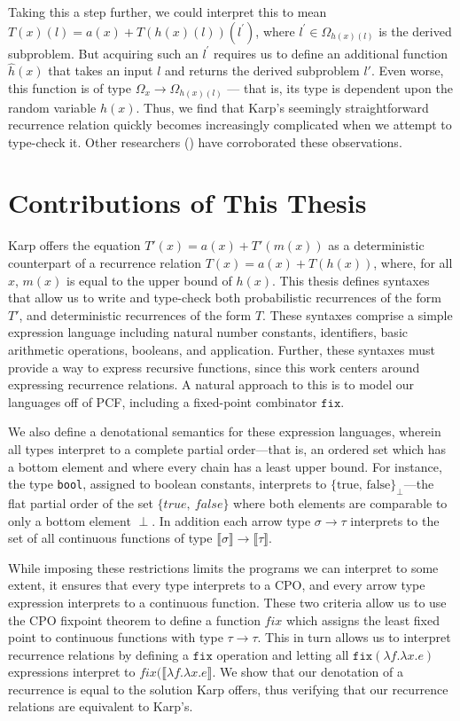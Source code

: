 Taking this a step further, we could interpret this to mean $T(x)(l) = a(x) + T(h(x)(l))(l^\prime)$, where $l^\prime \in 
\Omega_{h(x)(l)}$ is the derived subproblem. But acquiring such an $l^\prime$ requires us to define an 
additional function $\hat{h}(x)$ that takes an input $l$ and returns the derived subproblem $l'$. 
Even worse, this function is of type $\Omega_x \rightarrow \Omega_{h(x)(l)}$ --- that is, its type is dependent 
upon the random variable $h(x)$. Thus, we find that Karp's seemingly straightforward recurrence relation quickly becomes 
increasingly complicated when we attempt to type-check it. Other researchers (\cite{Tassarotti:2017aa}) have corroborated 
these observations. 


\section{Contributions of This Thesis}

Karp offers the equation $T'(x) = a(x) + T'(m(x))$ as a deterministic counterpart of a recurrence relation $T(x) = a(x) + 
T(h(x))$, where, for all $x$, $m(x)$ is equal to the upper bound of $h(x)$. This thesis defines syntaxes that allow
us to write and type-check both probabilistic recurrences of the form $T'$, and deterministic recurrences
of the form $T$. These syntaxes comprise a simple expression language including natural number constants, identifiers, basic arithmetic operations, booleans, and application. Further, these syntaxes must provide
a way to express recursive functions, since this work centers around expressing recurrence relations. 
A natural approach to this is to model our languages off of PCF, including a fixed-point combinator $\texttt{fix}$.  

 We also define a 
denotational semantics for these expression languages, wherein all types interpret to a complete partial order---that is, an ordered
set which has a bottom element and where every chain has a least upper bound. For instance, the type {\tt bool}, assigned
to boolean constants, interprets to $\{\text{true, false}\}_{\perp}$---the flat partial order of the set  $\{true, 
\ false\}$ where
both elements are comparable to only a bottom element $\perp$. In addition each arrow type $\sigma 
\rightarrow \tau$ interprets to the set of all continuous functions of type $\llbracket \sigma \rrbracket \rightarrow 
\llbracket \tau \rrbracket$. 

 While imposing these restrictions limits the programs we can interpret to some extent, it ensures 
that every type interprets to a CPO, and every arrow type expression interprets to a continuous function. These two 
criteria allow us to use the CPO fixpoint theorem to define a function $fix$ which assigns the least fixed point to continuous functions with type $\tau \rightarrow \tau$. This in turn allows us to interpret recurrence relations by defining a $\texttt{fix}$ operation and letting all $\texttt{fix}(\lambda f.\lambda x.e)$ expressions interpret to $fix(\llbracket\lambda f.\lambda x.e\rrbracket$. We show that our denotation of a recurrence is equal to the solution Karp offers,
thus verifying that our recurrence relations are equivalent to Karp's.
 
